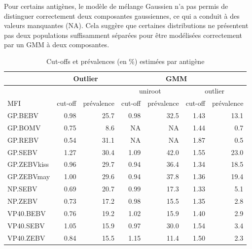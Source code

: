 \documentclass[a4paper]{article}
\begin{document}
Pour certains antigènes, le modèle de mélange Gaussien n’a pas permis de distinguer correctement deux composantes gaussiennes, ce qui a conduit à des valeurs manquantes (NA). Cela suggère que certaines distributions ne présentent pas deux populations suffisamment séparées pour être modélisées correctement par un GMM à deux composantes.

\begin{table}[H]

\caption{Cut-offs et prévalences (en \%) estimées par antigène}
\centering
\begin{tabular}{|l|rr|rrrr|}
\hline
& \multicolumn{2}{c|}{Outlier} & & \multicolumn{2}{c}{GMM} & \\ \hline
 & & & \multicolumn{2}{c|}{uniroot} & \multicolumn{2}{c|}{outlier} \\ \hline
MFI & cut-off & prévalence & cut-off & \multicolumn{1}{r|}{prévalence} & cut-off  & prévalence \\ \hline
GP.BEBV     & 0.98        & 25.7           & 0.98    & \multicolumn{1}{r|}{32.5}       & 1.43     & 13.1       \\ \hline
GP.BOMV     & 0.75        & 8.6            & NA      & \multicolumn{1}{r|}{NA}         & 1.44     & 0.7        \\ \hline
GP.REBV     & 0.54        & 31.1           & NA      & \multicolumn{1}{r|}{NA}         & 1.87    & 0.5        \\ \hline
GP.SEBV     & 1.27        & 30.4           & 1.09    & \multicolumn{1}{r|}{42.0}       & 1.55     & 23.0       \\ \hline
GP.ZEBVkiss & 0.96        & 29.7           & 0.94    & \multicolumn{1}{r|}{36.4}       & 1.34     & 18.5       \\ \hline
GP.ZEBVmay  & 1.00        & 29.6           & 0.94    & \multicolumn{1}{r|}{37.8}       & 1.36     & 19.4       \\ \hline
NP.SEBV     & 0.69        & 20.7           & 0.99    & \multicolumn{1}{r|}{17.3}       & 1.33     & 5.1        \\ \hline
NP.ZEBV     & 0.73        & 17.2           & 0.98    & \multicolumn{1}{r|}{15.5}       & 1.35     & 2.8        \\ \hline
VP40.BEBV   & 0.76        & 19.2           & 1.02    & \multicolumn{1}{r|}{15.9}       & 1.40     & 2.9        \\ \hline
VP40.SEBV   & 1.05        & 15.9           & 0.97    & \multicolumn{1}{r|}{30.0}       & 1.54     & 3.4        \\ \hline
VP40.ZEBV   & 0.84        & 15.5           & 1.15    & \multicolumn{1}{r|}{11.4}       & 1.50     & 2.3        \\ \hline
\end{tabular}

\end{table}
\end{document}

